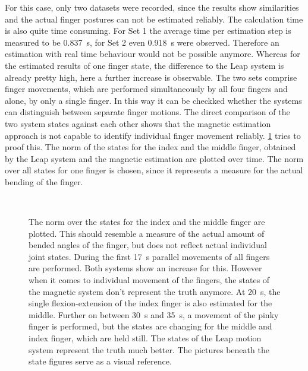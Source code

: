 For this case, only two datasets were recorded, since the results show similarities and the actual finger postures can not be estimated reliably. The calculation time is also quite time consuming. For Set 1 the average time per estimation step is measured to be \SI{0.837}{\second}, for Set 2 even \SI{0.918}{\second} were observed. Therefore an estimation with real time behaviour would not be possible anymore. Whereas for the estimated results of one finger state, the difference to the Leap system is already pretty high, here a further increase is observable. The two sets comprise finger movements, which are performed simultaneously by all four fingers and alone, by only a single finger. In this way it can be checkked whether the systems can distinguish between separate finger motions. The direct comparison of the two system states against each other shows that the magnetic estimation approach is not capable to identify individual finger movement reliably. \ref{fig:est44} tries to proof this. The norm of the states for the index and the middle finger, obtained by the Leap system and the magnetic estimation are plotted over time. The norm over all states for one finger is chosen, since it represents a measure for the actual bending of the finger. 
\begin{figure}[!htb]
\centering
{}\\
\caption[Estimating the motion of four fingers]
{The norm over the states for the index and the middle finger are plotted. This should resemble a measure of the actual amount of bended angles of the finger, but does not reflect actual individual joint states. During the first \SI{17}{\second} parallel movements of all fingers are performed. Both systems show an increase for this. However when it comes to individual movement of the fingers, the states of the magnetic system don't represent the truth anymore. At \SI{20}{\second}, the single flexion-extension of the index finger is also estimated for the middle. Further on between \SI{30}{\second} and \SI{35}{\second}, a movement of the pinky finger is performed, but the states are changing for the middle and index finger, which are held still. The states of the Leap motion system represent the truth much better. The pictures beneath the state figures serve as a visual reference.}
\label{fig:est44}
\end{figure}
